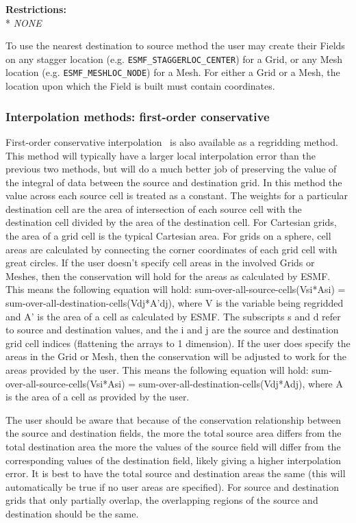 \smallskip

\textbf{Restrictions:}\\*
\textit{NONE}

\smallskip

 To use the nearest destination to source method the user may create their Fields on any stagger location (e.g. {\tt ESMF\_STAGGERLOC\_CENTER}) for a Grid, or
 any Mesh location (e.g. {\tt ESMF\_MESHLOC\_NODE}) for a Mesh. For either a Grid or a Mesh, the location upon which the Field is built 
 must contain coordinates. 

\subsubsection{Interpolation methods: first-order conservative}\label{sec:interpolation:conserve}
 First-order conservative interpolation~\cite{ConservativeOrder1} is also available as a regridding method. This method 
 will typically have  
 a larger local interpolation error than the previous two methods, but will do a much better job of preserving the value
 of the  integral of data between the source and destination grid. In this method the value across each source cell
 is treated as a constant. The weights for a particular destination cell are the area of intersection of each 
 source cell with the destination cell divided by the area of the destination cell. For Cartesian grids, the area of a grid cell is the typical Cartesian area. 
 For grids on a sphere, cell areas are calculated by connecting the corner coordinates of each grid cell with great circles. If the user doesn't specify
 cell areas in the involved Grids or Meshes, then the conservation will hold for the areas as calculated by 
 ESMF. This means the following equation will hold:  sum-over-all-source-cells(Vsi*Asi) = sum-over-all-destination-cells(Vdj*A'dj), where
 V is the variable being regridded and A' is the area of a cell as calculated by ESMF.  The subscripts s and d refer to source and destination values, and the i and j are the source 
 and destination grid cell indices (flattening the arrays to 1 dimension). If the user does specify the areas in the Grid or Mesh, then the conservation will be adjusted to work for the areas 
 provided by the user. This means the following equation will hold:  sum-over-all-source-cells(Vsi*Asi) = sum-over-all-destination-cells(Vdj*Adj),
 where A is the area of a cell as provided by the user. 

 The user should be aware that because of the conservation relationship between the source and destination fields, the more the total source area
 differs from the total destination area the more the values of the source field will differ from the corresponding values of the destination field, likely giving a higher 
 interpolation error. It is best to have the total source and destination areas the same (this will automatically be true if no user areas are specified). For source and destination grids 
 that only partially overlap, the overlapping regions of the source and destination should be the same.

